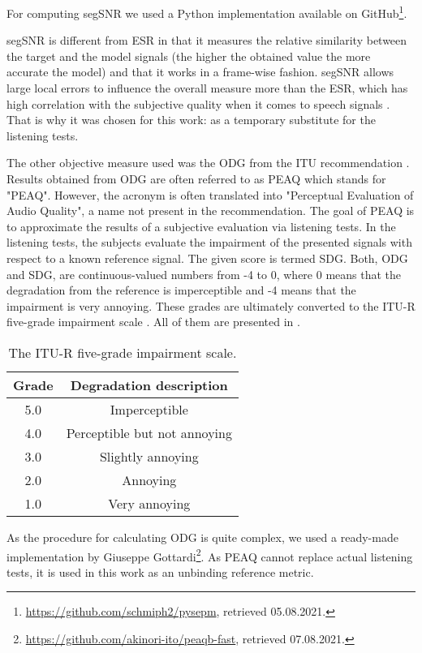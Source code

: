 

For computing \ac{segSNR} we used a Python implementation available on GitHub\footnote{\url{https://github.com/schmiph2/pysepm}, retrieved 05.08.2021.}.

\Ac{segSNR} is different from \ac{ESR} in that it measures the relative similarity between the target and the model signals (the higher the obtained value the more accurate the model) and that it works in a frame-wise fashion. \ac{segSNR} allows large local errors to influence the overall measure more than the \ac{ESR}, which has high correlation with the subjective quality when it comes to speech signals \cite{Hansen98}. That is why it was chosen for this work: as a temporary substitute for the listening tests.

The other objective measure used was the \ac{ODG} from the \ac{ITU} recommendation \cite{ITU1387}. 
Results obtained from \ac{ODG} are often referred to as \acs{PEAQ} which stands for "\acl{PEAQ}". However, the acronym is often translated into "Perceptual Evaluation of Audio Quality", a name not present in the recommendation. The goal of \acs{PEAQ} is to approximate the results of a subjective evaluation via listening tests. In the listening tests, the subjects evaluate the impairment of the presented signals with respect to a known reference signal. The given score is termed \ac{SDG}. Both, \ac{ODG} and \ac{SDG}, are continuous-valued numbers from -4 to 0, where 0 means that the degradation from the reference is imperceptible and -4 means that the impairment is very annoying. These grades are ultimately converted to the ITU-R five-grade impairment scale \cite{ITU1387}. All of them are presented in .

\begin{table}
  \centering
  \begin{tabular}{c c}
    \toprule
    \textbf{Grade} & \textbf{Degradation description} \\ \midrule
    5.0 & Imperceptible \\
    4.0 & Perceptible but not annoying \\
    3.0 & Slightly annoying \\
    2.0 & Annoying \\
    1.0 & Very annoying\\ \bottomrule
  \end{tabular}
  \caption{The ITU-R five-grade impairment scale.}
  \label{tab:itu_impairment_scale}
\end{table}

As the procedure for calculating \ac{ODG} is quite complex, we used a ready-made implementation by Giuseppe Gottardi\footnote{\url{https://github.com/akinori-ito/peaqb-fast}, retrieved 07.08.2021.}. As \acs{PEAQ} cannot replace actual listening tests, it is used in this work as an unbinding reference metric.
